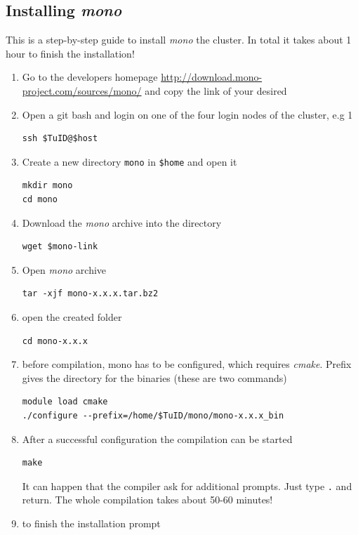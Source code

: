 \subsection{Installing \emph{mono}}
\label{sec:mono}
This is a step-by-step guide to install \emph{mono} the cluster. In total it takes about 1 hour to finish the installation!
\begin{enumerate}
\item Go to the developers homepage \url{http://download.mono-project.com/sources/mono/} and copy the link of your desired %
\item Open a git bash and login on one of the four login nodes of the cluster, e.g 1
\begin{verbatim}
ssh $TuID@$host
\end{verbatim}
\item Create a new directory \verb|mono| in \verb|$home| and open it
\begin{verbatim}
mkdir mono
cd mono
\end{verbatim}
\item Download the \emph{mono} archive into the directory
\begin{verbatim}
wget $mono-link
\end{verbatim}
\item Open \emph{mono} archive
\begin{verbatim}
tar -xjf mono-x.x.x.tar.bz2
\end{verbatim}
\item open the created folder
\begin{verbatim}
cd mono-x.x.x
\end{verbatim}
\item before compilation, mono has to be configured, which requires \emph{cmake}. Prefix gives the directory for the binaries (these are two commands)
\begin{verbatim}
module load cmake
./configure --prefix=/home/$TuID/mono/mono-x.x.x_bin
\end{verbatim} 
\item After a successful configuration the compilation can be started
\begin{verbatim}
make
\end{verbatim}
It can happen that the compiler ask for additional prompts. Just type \verb|.| and return.
The whole compilation takes about 50-60 minutes!
\item to finish the installation prompt
\begin{verbatim}

\end{verbatim}
\end{enumerate}

